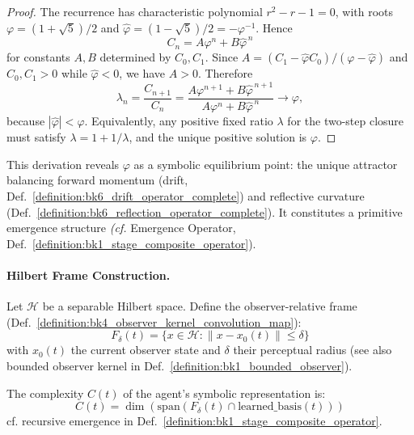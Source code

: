 \begin{proof}
\label{proof:appC_phi_from_lagrangian}
The recurrence has characteristic polynomial $r^2-r-1=0$, with roots
$\varphi=(1+\sqrt5)/2$ and $\widehat\varphi=(1-\sqrt5)/2=-\varphi^{-1}$. Hence
\[
C_n=A\varphi^n+B\widehat\varphi^{\,n}
\]
for constants $A,B$ determined by $C_0,C_1$. Since
$A=(C_1-\widehat\varphi C_0)/(\varphi-\widehat\varphi)$ and
$C_0,C_1>0$ while $\widehat\varphi<0$, we have $A>0$. Therefore
\[
\lambda_n=\frac{C_{n+1}}{C_n}
=\frac{A\varphi^{n+1}+B\widehat\varphi^{\,n+1}}
       {A\varphi^n+B\widehat\varphi^{\,n}}
\longrightarrow \varphi,
\]
because $|\widehat\varphi|<\varphi$. Equivalently, any positive fixed ratio
$\lambda$ for the two-step closure must satisfy
$\lambda=1+1/\lambda$, and the unique positive solution is $\varphi$.
\end{proof}

\begin{scholium}
This derivation reveals $\varphi$ as a symbolic equilibrium point: the unique attractor balancing forward momentum (drift, Def.~\ref{definition:bk6_drift_operator_complete}) and reflective curvature (Def.~\ref{definition:bk6_reflection_operator_complete}). It constitutes a primitive emergence structure \textit{(cf.} Emergence Operator, Def.~\ref{definition:bk1_stage_composite_operator}).
\end{scholium}

\paragraph{Hilbert Frame Construction.}
\label{subsec:appC_bounded_frame_dynamics_on_hilbert_manifolds}

\begin{definition}
\label{definition:appC_bounded_observation_frame}
Let $\mathcal{H}$ be a separable Hilbert space. Define the observer-relative frame (Def.~\ref{definition:bk4_observer_kernel_convolution_map}):
\[
F_\delta(t) = \{x \in \mathcal{H} : \|x - x_0(t)\| \leq \delta\}
\]
with $x_0(t)$ the current observer state and $\delta$ their perceptual radius (see also bounded observer kernel in Def.~\ref{definition:bk1_bounded_observer}).
\end{definition}

\begin{definition}
\label{definition:appC_complexity_measure}
The complexity $C(t)$ of the agent’s symbolic representation is:
\[
C(t) = \dim\left(\text{span}(F_\delta(t) \cap \text{learned\_basis}(t))\right)
\]
cf. recursive emergence in Def.~\ref{definition:bk1_stage_composite_operator}.
\end{definition}

